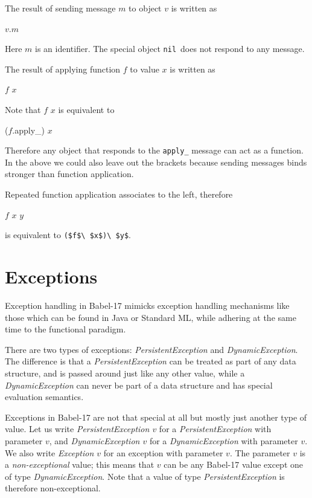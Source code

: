 \documentclass[11pt]{amsart}
\newcommand{\metababel}[1] {\textsl{#1}}
\newcommand{\babelsrc}[1] {\lstinline!#1!}
\begin{document}
The result of sending message $m$ to object $v$  is written as
\begin{babellisting}
$v$.$m$
\end{babellisting}
Here $m$ is an identifier. The special object \babelsrc{nil}\ does not respond to any message.

The result of applying function $f$ to value $x$ is written as 
\begin{babellisting}
$f$ $x$
\end{babellisting}
Note that $f$ $x$ is equivalent to 
\begin{babellisting}
($f$.apply_) $x$
\end{babellisting}
Therefore any object that responds to the \babelsrc{apply_} message can act as a function.
In the above we could also leave out the brackets because sending messages binds stronger than function application. 

Repeated function application associates to the left, therefore 
\begin{babellisting}
$f$ $x$ $y$ 
\end{babellisting} 
is equivalent to \babelsrc{($f$\ $x$)\ $y$}.

\section{Exceptions}
Exception handling in Babel-17 mimicks exception handling mechanisms like those which can be found in Java or Standard ML, while adhering at the same time to the functional paradigm.

There are two types of exceptions: \metababel{PersistentException} and  \metababel{DynamicException}.
The difference is that a \metababel{PersistentException}  can be treated as part of any data structure, and is passed around just like any other value, while a \metababel{DynamicException} can never be part of a data structure and has special evaluation semantics. 

Exceptions in Babel-17 are not that special at all but mostly just another type of value.  Let us write \metababel{PersistentException $v$} for a \metababel{PersistentException} with parameter $v$,
and  \metababel{DynamicException $v$} for a \metababel{DynamicException} with parameter $v$. 
We also write \metababel{Exception $v$} for an exception with parameter $v$. The parameter $v$ is a \emph{non-exceptional} value; this means that $v$ can be any Babel-17 value except one of type \metababel{DynamicException}. Note that a value of type \metababel{PersistentException} is therefore non-exceptional.
\end{document}

